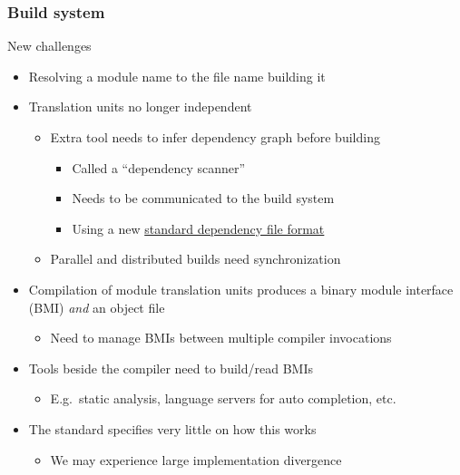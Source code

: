 \begin{frame}[fragile]
    \frametitle{Build system}
    \begin{block}{New challenges}
      \begin{itemize}
        \item Resolving a module name to the file name building it
        \item Translation units no longer independent
        \begin{itemize}
          \item Extra tool needs to infer dependency graph before building
          \begin{itemize}
            \item Called a ``dependency scanner''
            \item Needs to be communicated to the build system
            \item Using a new \href{https://wg21.link/P1689}{standard dependency file format}
          \end{itemize}
          \item Parallel and distributed builds need synchronization
        \end{itemize}
        \item Compilation of module translation units produces a binary module interface (BMI) \emph{and} an object file
        \begin{itemize}
          \item Need to manage BMIs between multiple compiler invocations
        \end{itemize}
        \item Tools beside the compiler need to build/read BMIs
        \begin{itemize}
          \item E.g.\ static analysis, language servers for auto completion, etc.
        \end{itemize}
        \item The \cpp standard specifies very little on how this works
        \begin{itemize}
          \item We may experience large implementation divergence
        \end{itemize}
      \end{itemize}
    \end{block}
\end{frame}

